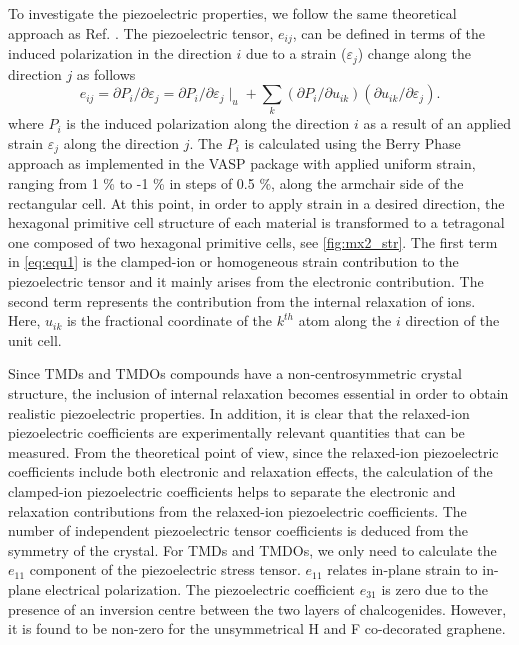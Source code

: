 To investigate the piezoelectric properties, we follow the same theoretical approach as Ref. \cite{Duerloo2012}. The piezoelectric tensor\cite{baroni,PhysRevB.72.035105}, $e_{ij}$, can be defined in terms of the induced polarization in the  direction $i$ due to a strain ($\varepsilon_{j}$) change along the direction $j$ as follows
\begin{equation}
e_{ij}=\partial P_{i}/\partial\varepsilon_{j}=\partial P_{i}/\partial\varepsilon_{j}\mid_u+\sum_k (\partial P_{i}/\partial u_{ik})(\partial u_{ik}/\partial\varepsilon_{j}). \label{eq:equ1}
\end{equation}
where $P_i$ is the induced polarization along the direction $i$ as a result of an applied strain $\varepsilon_{j}$ along the direction $j$. 
The $P_i$ is calculated using the Berry Phase approach\cite{vanderbilt2000} as implemented in the VASP package with applied uniform strain, ranging from 1 \% to -1 \% in steps of 0.5 \%, along the armchair side of the rectangular cell. At this point, in order to apply strain in a desired direction, the hexagonal primitive cell structure of each material is transformed to a tetragonal one composed of two hexagonal primitive cells\cite{Duerloo2012}, see \autoref{fig:mx2_str}. The first term in \autoref{eq:equ1} is the clamped-ion or homogeneous strain contribution to the piezoelectric tensor and it mainly arises from the electronic contribution. The second term represents the contribution from the internal relaxation of ions. Here, $u_{ik}$ is the fractional coordinate of the $k^{th}$ atom along the $i$ direction of the unit cell. 

Since TMDs and TMDOs compounds have a non-centrosymmetric crystal structure, the inclusion of internal relaxation becomes essential in order to obtain realistic piezoelectric properties. In addition, it is clear that the relaxed-ion piezoelectric coefficients are experimentally relevant quantities that can be measured. From the theoretical point of view, since the relaxed-ion piezoelectric coefficients include both electronic and relaxation effects, the calculation of the clamped-ion piezoelectric coefficients helps to separate the electronic and relaxation contributions from the relaxed-ion piezoelectric coefficients. The number of independent piezoelectric tensor coefficients is deduced from the symmetry of the crystal. For TMDs and TMDOs, we only need to calculate the $e_{11}$ component of the piezoelectric stress tensor. $e_{11}$ relates in-plane strain to in-plane electrical polarization. The piezoelectric coefficient $e_{31}$ is zero due to the presence of an inversion centre between the two layers of chalcogenides. However, it is found to be non-zero for the unsymmetrical H and F co-decorated graphene\cite{Ong2013,KIM201462}. 

